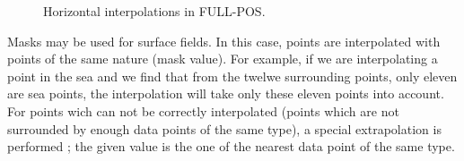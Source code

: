 \begin{figure}[h]
\hspace*{2.5cm}
\caption{Horizontal interpolations in FULL-POS.
\label{3Dhorinterp}}
\end{figure}

Masks may be used for surface fields. In this case, points are interpolated with
points of the same nature (mask value). For example, if we are interpolating a
point in the sea and we find that from the twelwe surrounding points, only eleven
are sea points, the interpolation will take only these eleven points into account.
\\
For points wich can not be correctly interpolated (points which are not surrounded
by enough data points of the same type), a special extrapolation is performed ; the
given value is the one of the nearest data point of the same type.

